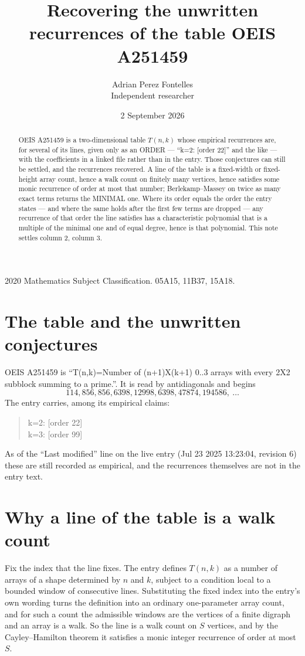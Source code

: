 \documentclass[11pt,a4paper]{article}
\title{Recovering the unwritten recurrences of the table OEIS A251459}
\author{Adrian Perez Fontelles\\ \small Independent researcher}
\date{2 September 2026}
\theoremstyle{plain}
\theoremstyle{definition}
\begin{document}
\maketitle

\begin{abstract}
OEIS A251459 is a two-dimensional table $T(n,k)$ whose empirical recurrences are, for several of
its lines, given only as an ORDER --- ``k=2: [order 22]'' and the like --- with the
coefficients in a linked file rather than in the entry. Those conjectures can still be settled,
and the recurrences recovered. A line of the table is a fixed-width or fixed-height array
count, hence a walk count on finitely many vertices, hence satisfies some monic recurrence of
order at most that number; Berlekamp--Massey on twice as many exact terms returns the MINIMAL
one. Where its order equals the order the entry states --- and where the same holds after the
first few terms are dropped --- any recurrence of that order the line satisfies has a
characteristic polynomial that is a multiple of the minimal one and of equal degree, hence is
that polynomial. This note settles column 2, column 3.
\end{abstract}

\noindent\small 2020 Mathematics Subject Classification. 05A15, 11B37, 15A18.\normalsize

\section{The table and the unwritten conjectures}

OEIS A251459 is ``T(n,k)=Number of (n+1)X(k+1) 0..3 arrays with every 2X2 subblock summing to a prime.''. It is read by antidiagonals and begins
\[
114, 856, 856, 6398, 12998, 6398, 47874, 194586,\ \dots
\]
The entry carries, among its empirical claims:
\begin{quote}\small
k=2: [order 22]\\
k=3: [order 99]
\end{quote}
As of the ``Last modified'' line on the live entry (Jul 23 2025 13:23:04, revision 6) these are still
recorded as empirical, and the recurrences themselves are not in the entry text.

\section{Why a line of the table is a walk count}

Fix the index that the line fixes. The entry defines $T(n,k)$ as a number of arrays of a shape
determined by $n$ and $k$, subject to a condition local to a bounded window of consecutive
lines. Substituting the fixed index into the entry's own wording turns the definition into an
ordinary one-parameter array count, and for such a count the admissible windows are the
vertices of a finite digraph and an array is a walk. So the line is a walk count on $S$
vertices, and by the Cayley--Hamilton theorem it satisfies a monic integer recurrence of order
at most $S$.
\end{document}
